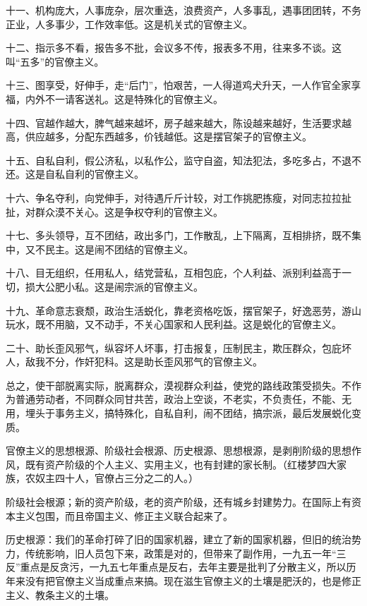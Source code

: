 十一、机构庞大，人事庞杂，层次重迭，浪费资产，人多事乱，遇事团团转，不务正业，人多事少，工作效率低。这是机关式的官僚主义。

十二、指示多不看，报告多不批，会议多不传，报表多不用，往来多不谈。这叫“五多”的官僚主义。

十三、图享受，好伸手，走“后门”，怕艰苦，一人得道鸡犬升天，一人作官全家享福，内外不一请客送礼。这是特殊化的官僚主义。

十四、官越作越大，脾气越来越坏，房子越来越大，陈设越来越好，生活要求越高，供应越多，分配东西越多，价钱越低。这是摆官架子的官僚主义。

十五、自私自利，假公济私，以私作公，监守自盗，知法犯法，多吃多占，不退不还。这是自私自利的官僚主义。

十六、争名夺利，向党伸手，对待遇斤斤计较，对工作挑肥拣瘦，对同志拉拉扯扯，对群众漠不关心。这是争权夺利的官僚主义。

十七、多头领导，互不团结，政出多门，工作散乱，上下隔离，互相排挤，既不集中，又不民主。这是闹不团结的官僚主义。

十八、目无组织，任用私人，结党营私，互相包庇，个人利益、派别利益高于一切，损大公肥小私。这是闹宗派的官僚主义。

十九、革命意志衰颓，政治生活蜕化，靠老资格吃饭，摆官架子，好逸恶劳，游山玩水，既不用脑，又不动手，不关心国家和人民利益。这是蜕化的官僚主义。

二十、助长歪风邪气，纵容坏人坏事，打击报复，压制民主，欺压群众，包庇坏人，敌我不分，作奸犯科。这是助长歪风邪气的官僚主义。

总之，使干部脱离实际，脱离群众，漠视群众利益，使党的路线政策受损失。不作为普通劳动者，不同群众同甘共苦，政治上空谈，不老实，不负责任，不能、无用，埋头于事务主义，搞特殊化，自私自利，闹不团结，搞宗派，最后发展蜕化变质。

官僚主义的思想根源、阶级社会根源、历史根源、思想根源，是剥削阶级的思想作风，既有资产阶级的个人主义、实用主义，也有封建的家长制。（红楼梦四大家族，农奴主四十人，官僚占三分之二的人。）

阶级社会根源；新的资产阶级，老的资产阶级，还有城乡封建势力。在国际上有资本主义包围，而且帝国主义、修正主义联合起来了。

历史根源：我们的革命打碎了旧的国家机器，建立了新的国家机器，但旧的统治势力，传统影响，旧人员包下来，政策是对的，但带来了副作用，一九五一年“三反”重点是反贪污，一九五七年重点是反右，去年主要是批判了分散主义，所以历年来没有把官僚主义当成重点来搞。现在滋生官僚主义的土壤是肥沃的，也是修正主义、教条主义的土壤。



